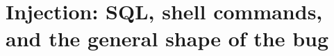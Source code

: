 \chapter{Injection: SQL, shell commands, and the general shape of the bug}
\label{ch:injection-sql-shell-commands-and-the}

